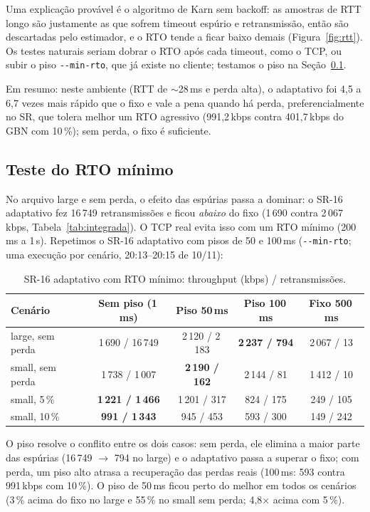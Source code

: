 \documentclass[11pt,a4paper]{article}
\newcommand{\cod}[1]{\textcolor{codverde}{\texttt{\small #1}}}
\begin{document}
Uma explicação provável é o algoritmo de Karn sem backoff: as amostras de RTT longo são justamente as
que sofrem timeout espúrio e retransmissão, então são descartadas pelo estimador, e o RTO tende a
ficar baixo demais (Figura~\ref{fig:rtt}). Os testes naturais seriam dobrar o RTO após cada timeout,
como o TCP, ou subir o piso \cod{-{}-min-rto}, que já existe no cliente; testamos o piso na
Seção~\ref{sec:rto-min}.

Em resumo: neste ambiente (RTT de $\sim$28\,ms e perda alta), o adaptativo foi 4,5 a 6,7 vezes mais
rápido que o fixo e vale a pena quando há perda, preferencialmente no SR, que tolera melhor um RTO
agressivo (991,2\,kbps contra 401,7\,kbps do GBN com 10\,\%); sem perda, o fixo é suficiente.

\subsection{Teste do RTO mínimo}\label{sec:rto-min}

No arquivo large e sem perda, o efeito das espúrias passa a dominar: o SR-16 adaptativo fez 16\,749
retransmissões e ficou \emph{abaixo} do fixo (1\,690 contra 2\,067\,kbps, Tabela~\ref{tab:integrada}).
O TCP real evita isso com um RTO mínimo (200\,ms a 1\,s). Repetimos o SR-16 adaptativo com pisos de 50
e 100\,ms (\cod{-{}-min-rto}; uma execução por cenário, 20:13--20:15 de 10/11):

\begin{table}[H]
\centering\small
\caption{SR-16 adaptativo com RTO mínimo: throughput (kbps) / retransmissões.}
\label{tab:rto-min}
\begin{tabular}{@{}l cccc@{}}
\toprule
\textbf{Cenário} & \textbf{Sem piso (1\,ms)} & \textbf{Piso 50\,ms} & \textbf{Piso 100\,ms} & \textbf{Fixo 500\,ms}\\
\midrule
large, sem perda  & 1\,690 / 16\,749 & 2\,120 / 2\,183 & \textbf{2\,237 / 794} & 2\,067 / 13\\
small, sem perda  & 1\,738 / 1\,007  & \textbf{2\,190 / 162} & 2\,144 / 81 & 1\,412 / 10\\
small, 5\,\%      & \textbf{1\,221 / 1\,466} & 1\,201 / 317 & 824 / 175 & 249 / 105\\
small, 10\,\%     & \textbf{991 / 1\,343}  & 945 / 453 & 593 / 300 & 149 / 242\\
\bottomrule
\end{tabular}
\end{table}

O piso resolve o conflito entre os dois casos: sem perda, ele elimina a maior parte das espúrias
(16\,749 $\rightarrow$ 794 no large) e o adaptativo passa a superar o fixo; com perda, um piso alto
atrasa a recuperação das perdas reais (100\,ms: 593 contra 991\,kbps com 10\,\%). O piso de 50\,ms
ficou perto do melhor em todos os cenários (3\,\% acima do fixo no large e 55\,\% no small sem perda;
4,8$\times$ acima com 5\,\%).
\end{document}
